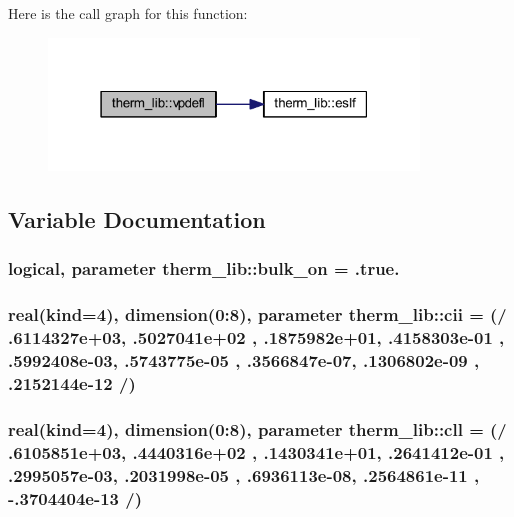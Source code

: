 Here is the call graph for this function\+:\nopagebreak
\begin{figure}[H]
\begin{center}
\leavevmode
\includegraphics[width=279pt]{namespacetherm__lib_a6f84a6e1d410eb7f89dd59a9f6a13f3b_cgraph}
\end{center}
\end{figure}




\subsection{Variable Documentation}
\subsubsection[{\texorpdfstring{bulk\+\_\+on}{bulk_on}}]{\setlength{\rightskip}{0pt plus 5cm}logical, parameter therm\+\_\+lib\+::bulk\+\_\+on = .true.}\hypertarget{namespacetherm__lib_a74e34c886f54fe2ca038c4f301d31beb}{}\label{namespacetherm__lib_a74e34c886f54fe2ca038c4f301d31beb}
\subsubsection[{\texorpdfstring{cii}{cii}}]{\setlength{\rightskip}{0pt plus 5cm}real(kind=4), dimension(0\+:8), parameter therm\+\_\+lib\+::cii = (/ .\+6114327e+03, .\+5027041e+02 , .\+1875982e+01, .\+4158303e-\/01 , .\+5992408e-\/03, .\+5743775e-\/05 , .\+3566847e-\/07, .\+1306802e-\/09 , .\+2152144e-\/12 /)}\hypertarget{namespacetherm__lib_a80e96618552a9428c5819e0f9fcbc242}{}\label{namespacetherm__lib_a80e96618552a9428c5819e0f9fcbc242}
\subsubsection[{\texorpdfstring{cll}{cll}}]{\setlength{\rightskip}{0pt plus 5cm}real(kind=4), dimension(0\+:8), parameter therm\+\_\+lib\+::cll = (/ .\+6105851e+03, .\+4440316e+02 , .\+1430341e+01, .\+2641412e-\/01 , .\+2995057e-\/03, .\+2031998e-\/05 , .\+6936113e-\/08, .\+2564861e-\/11 , -\/.\+3704404e-\/13 /)}\hypertarget{namespacetherm__lib_a0fd2184c73856d805e115f4a13068150}{}\label{namespacetherm__lib_a0fd2184c73856d805e115f4a13068150}
